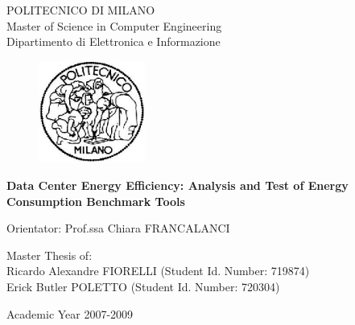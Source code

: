 %
%
%  
\begin{titlepage}
\vspace*{-1.5cm}
\bfseries{

\begin{center}
  \large POLITECNICO DI MILANO\\
  
  \normalsize Master of Science in Computer Engineering\\
              Dipartimento di Elettronica e Informazione\\
  
  \vspace{1cm}
  
  \begin{figure}[htbp]
  \centering
  \includegraphics[width=3.5cm]{graphics/logopoli}
  \end{figure}
  
  \vspace*{0.3cm} \LARGE

  \textbf{Data Center Energy Efficiency: Analysis and Test of Energy Consumption Benchmark Tools}\\
    
\end{center}

\vspace*{1.5cm} \large

\begin{flushleft}
  Orientator: Prof.ssa Chiara FRANCALANCI
\end{flushleft}

\vspace*{1.6cm}

\begin{flushright}
  Master Thesis of:\\ 
  Ricardo Alexandre FIORELLI (Student Id. Number: 719874)\\
  Erick Butler POLETTO (Student Id. Number: 720304)\\
\end{flushright}

\vspace*{1.0cm}

\begin{center}
  Academic Year 2007-2009
\end{center} 
}
\end{titlepage}
